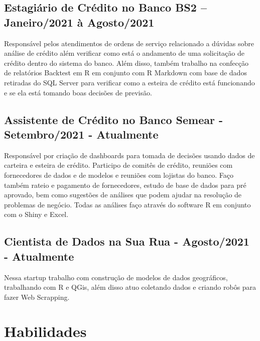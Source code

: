 \documentclass[
]{book}
\begin{document}
\hypertarget{estagiuxe1rio-de-cruxe9dito-no-banco-bs2-janeiro2021-uxe0-agosto2021}{%
\subsection{Estagiário de Crédito no Banco BS2 -- Janeiro/2021 à Agosto/2021}\label{estagiuxe1rio-de-cruxe9dito-no-banco-bs2-janeiro2021-uxe0-agosto2021}}

Responsável pelos atendimentos de ordens de serviço relacionado a dúvidas sobre análise de crédito além verificar como está o andamento de uma solicitação de crédito dentro do sistema do banco. Além disso, também trabalho na confecção de relatórios Backtest em R em conjunto com R Markdown com base de dados retiradas do SQL Server para verificar como a esteira de crédito está funcionando e se ela está tomando boas decisões de previsão.

\hypertarget{assistente-de-cruxe9dito-no-banco-semear---setembro2021---atualmente}{%
\subsection{Assistente de Crédito no Banco Semear - Setembro/2021 - Atualmente}\label{assistente-de-cruxe9dito-no-banco-semear---setembro2021---atualmente}}

Responsável por criação de dashboards para tomada de decisões usando dados de carteira e esteira de crédito. Participo de comitês de crédito, reuniões com fornecedores de dados e de modelos e reuniões com lojistas do banco.
Faço também rateio e pagamento de fornecedores, estudo de base de dados para pré aprovado, bem como sugestões de análises que podem ajudar na resolução de problemas de negócio.
Todas as análises faço através do software R em conjunto com o Shiny e Excel.

\hypertarget{cientista-de-dados-na-sua-rua---agosto2021---atualmente}{%
\subsection{Cientista de Dados na Sua Rua - Agosto/2021 - Atualmente}\label{cientista-de-dados-na-sua-rua---agosto2021---atualmente}}

Nessa startup trabalho com construção de modelos de dados geográficos, trabalhando com R e QGis, além disso atuo coletando dados e criando robôs para fazer Web Scrapping.

\hypertarget{habilidades}{%
\section{Habilidades}\label{habilidades}}
\end{document}
